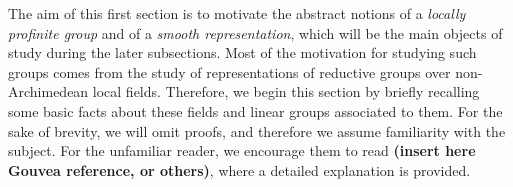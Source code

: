 The aim of this first section is to motivate the abstract notions of a \textit{locally profinite group} and of a \textit{smooth representation}, which will be the main objects of study during the later subsections. Most of the motivation for studying such groups comes from the study of representations of reductive groups over non-Archimedean local fields. Therefore, we begin this section by briefly recalling some basic facts about these fields and linear groups associated to them. For the sake of brevity, we will omit proofs, and therefore we assume familiarity with the subject. For the unfamiliar reader, we encourage them to read \textbf{(insert here Gouvea reference, or others)}, where a detailed explanation is provided. 







\newpage

